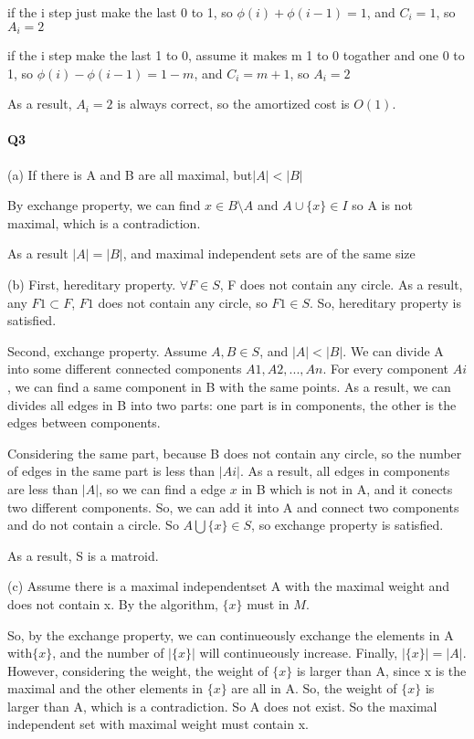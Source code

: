 \documentclass[UTF8]{ctexart}
\renewcommand{\(}{\left(}
\renewcommand{\)}{\right)}
\begin{document}
if the i step just make the last 0 to 1, so $\phi(i) + \phi(i-1) = 1$, and $C_{i} = 1$, so $A_{i} = 2$

if the i step make the last 1 to 0, assume it makes m 1 to 0 togather and one 0 to 1, so $\phi(i) - \phi(i-1) = 1-m$, and $C_{i} = m+1$, so $A_{i} = 2$

As a result, $A_{i} = 2$ is always correct, so the amortized cost is $O(1)$.


\paragraph{Q3}

(a) If there is A and B are all maximal, but$ \vert A \vert < \vert B \vert$

By exchange property, we can find $x \in B\setminus A$ and $A\cup \{ x \} \in I  $
so A is not maximal, which is a contradiction.

As a result $\vert A \vert = \vert B \vert$, and maximal independent sets are
of the same size

(b) First, hereditary property. $\forall F \in S$, F does not contain any circle. As a result, 
any $F1 \subset F$, $F1$ does not contain any circle, so $F1 \in S$. So, hereditary property is satisfied.

Second, exchange property. Assume $A,B \in S$, and $ \vert A \vert <  \vert B \vert  $. We can divide A into some 
different connected components $A1,A2,...,An$. 
For every component $Ai$, we can find a same component in B with the same points. As a result, we can divides all
edges in B into two parts: one part is in components, the other is the edges between components.

Considering the same part, because B does not contain any circle, so the number of edges in the same part is less than $\vert Ai \vert$.
As a result, all edges in components are less than $\vert A \vert$, so we can find a edge $x$ in B which is not in A, and it conects two different components.
So, we can add it into A and connect two components and do not contain a circle. So $A\bigcup \{ x\} \in S$, so exchange property is satisfied.

As a result, S is a matroid.

(c) Assume there is a maximal independentset A with the maximal weight and does not contain x.
By the algorithm, $\{ x\}$ must in $M$. 

So, by the exchange property, we can continueously exchange the elements in A with$\{ x\}$, and the number of $\vert \{ x\} \vert$ will continueously increase.
Finally, $\vert \{ x\} \vert = \vert A \vert$. However, considering the weight, the weight of $\{ x\}$ is larger than A, since x is the maximal and the other elements in
$\{ x\}$ are all in A. So, the weight of $\{ x\}$ is larger than A, which is a contradiction.
So A does not exist. So the maximal independent set with maximal weight must contain x.
\end{document}
